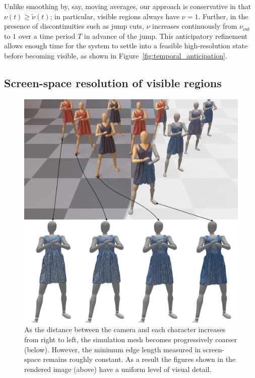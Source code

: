 \documentclass[10pt,journal,compsoc,twoside]{TexInputs/IEEEtran}
\begin{document}
Unlike smoothing by, say, moving averages, our approach is conservative in that $\nu(t) \ge \tilde\nu(t)$; in particular, visible regions always have $\nu = 1$.
Further, in the presence of discontinuities such as jump cuts, $\nu$ increases continuously from $\nu_{\text{out}}$ to $1$ over a time period $T$ in advance of the jump.
This anticipatory refinement allows enough time for the system to settle into a feasible high-resolution state before becoming visible, as shown in Figure~\ref{fig:temporal_anticipation}.

\subsection{Screen-space resolution of visible regions}

\begin{figure}[t]
    \centering
    \includegraphics[width=1.0\columnwidth]{screen-space_resizing/screen-space_resizing.pdf}
    \caption{As the distance between the camera and each
    character increases from right to left, the simulation mesh becomes progressively coarser (below).
  However, the minimum edge length measured in screen-space remains roughly constant.  As a result the 
  figures shown in the rendered image (above) have a uniform level of visual detail.
  }
    \label{fig:screen-space_resizing}
\end{figure}
\end{document}
